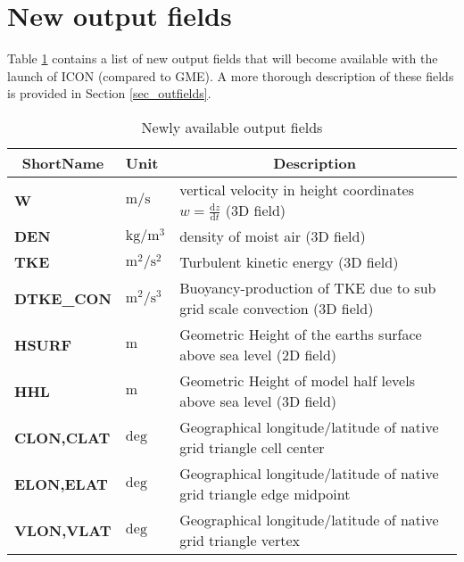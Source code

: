 \section{New output fields}\label{sec_newout}
Table \ref{table_newout} contains a list of new output fields that will become available with the launch of ICON (compared to GME). A more thorough description of these 
fields is provided in Section \ref{sec_outfields}.
\begin{table}[H]
\centering
\caption{Newly available output fields}\label{table_newout}
 \begin{tabular}{p{2.5cm}p{1.8cm}p{10.0cm}}
  \toprule
\multicolumn{1}{c}{\textbf{ShortName}}  &  \bf{Unit}                  & \multicolumn{1}{c}{\textbf{Description}}\\
\midrule
\textbf{W}                              &  $\mathrm{m/s}$             &  vertical velocity in height coordinates $w=\frac{\mathrm{d}z}{\mathrm{d}t}$ (3D field)\\
\textbf{DEN}                            &  $\mathrm{kg/m^{3}}$        &  density of moist air (3D field) \\
\textbf{TKE}                            &  $\mathrm{m^{2}/s^{2}}$     &  Turbulent kinetic energy (3D field) \\
\textbf{DTKE\_CON}                      &  $\mathrm{m^{2}/s^{3}}$     &  Buoyancy-production of TKE due to sub grid scale convection (3D field) \\
\textbf{HSURF}                          &  $\mathrm{m}$               &  Geometric Height of the earths surface above sea level (2D field) \\
\textbf{HHL}                            &  $\mathrm{m}$               &  Geometric Height of model half levels above sea level (3D field) \\
\textbf{CLON,CLAT}                      &  $\mathrm{deg}$             &  Geographical longitude/latitude of native grid triangle cell center \\
\textbf{ELON,ELAT}                      &  $\mathrm{deg}$             &  Geographical longitude/latitude of native grid triangle edge midpoint \\
\textbf{VLON,VLAT}                      &  $\mathrm{deg}$             &  Geographical longitude/latitude of native grid triangle vertex \\
  \bottomrule
 \end{tabular}
\end{table}




